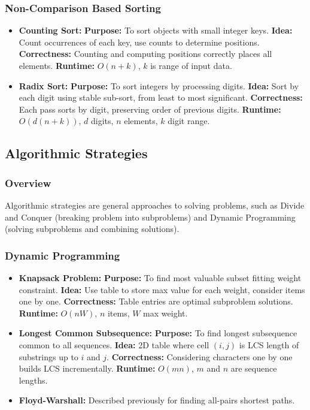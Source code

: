 \documentclass[landscape,7pt]{extarticle}
\begin{document}
\begin{multicols*}{3}
\subsubsection*{Non-Comparison Based Sorting}
\begin{itemize}
\item \textbf{Counting Sort:} \textbf{Purpose:} To sort objects with small integer keys. \textbf{Idea:} Count occurrences of each key, use counts to determine positions. \textbf{Correctness:} Counting and computing positions correctly places all elements. \textbf{Runtime:} $O(n+k)$, $k$ is range of input data.
\item \textbf{Radix Sort:} \textbf{Purpose:} To sort integers by processing digits. \textbf{Idea:} Sort by each digit using stable sub-sort, from least to most significant. \textbf{Correctness:} Each pass sorts by digit, preserving order of previous digits. \textbf{Runtime:} $O(d(n+k))$, $d$ digits, $n$ elements, $k$ digit range.
\end{itemize}

\subsection*{Algorithmic Strategies}

\subsubsection*{Overview}
Algorithmic strategies are general approaches to solving problems, such as Divide and Conquer (breaking problem into subproblems) and Dynamic Programming (solving subproblems and combining solutions).

\subsubsection*{Dynamic Programming}
\begin{itemize}
\item \textbf{Knapsack Problem:} \textbf{Purpose:} To find most valuable subset fitting weight constraint. \textbf{Idea:} Use table to store max value for each weight, consider items one by one. \textbf{Correctness:} Table entries are optimal subproblem solutions. \textbf{Runtime:} $O(nW)$, $n$ items, $W$ max weight.
\item \textbf{Longest Common Subsequence:} \textbf{Purpose:} To find longest subsequence common to all sequences. \textbf{Idea:} 2D table where cell $(i,j)$ is LCS length of substrings up to $i$ and $j$. \textbf{Correctness:} Considering characters one by one builds LCS incrementally. \textbf{Runtime:} $O(mn)$, $m$ and $n$ are sequence lengths.
\item \textbf{Floyd-Warshall:} Described previously for finding all-pairs shortest paths.
\end{itemize}


\end{multicols*}
\end{document}

